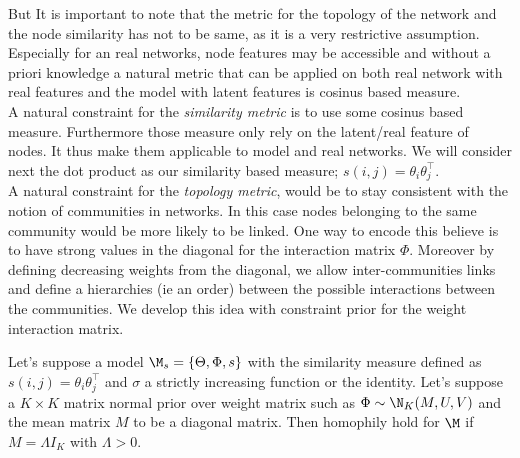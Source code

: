 But It is important to note that the metric for the topology of the network and the node similarity has not to be same, as it is a very restrictive assumption. Especially for an real networks, node features may be accessible and without a priori knowledge a natural metric that can be applied on both real network with real features and the model with latent features is cosinus based measure.~\\

A natural constraint for the \emph{similarity metric} is to use some cosinus based measure. Furthermore those measure only rely on the latent/real feature of nodes. It thus make them applicable to model and real networks. We will consider next the dot product as our similarity based measure; $s(i,j) = \theta_i \theta_j^\top$.~\\

A natural constraint for the \emph{topology metric}, would be to stay consistent with the notion of communities in networks. In this case nodes belonging to the same community would be more likely to be linked. One way to encode this believe is to have strong values in the diagonal for the interaction matrix $\Phi$. Moreover by defining decreasing weights from the diagonal, we allow inter-communities links and define a hierarchies (ie an order) between the possible interactions between the communities. We develop this idea with constraint prior for the weight interaction matrix.


\begin{proposition}[] \label{prop:hom_mn}
Let's suppose a model $ \M_s=\{\Theta, \Phi, s\}$ with the similarity measure defined as $s(i,j) = \theta_i \theta_j^\top$ and $\sigma$ a strictly increasing function or the identity. Let's suppose a $K\times K$ matrix normal prior over weight matrix such as $\Phi \sim \N_K(M, U, V)$ and the mean matrix $M$ to be a diagonal matrix. Then homophily hold for $\M$ if $M=\Lambda I_K$ with $\Lambda > 0$.
\end{proposition}

